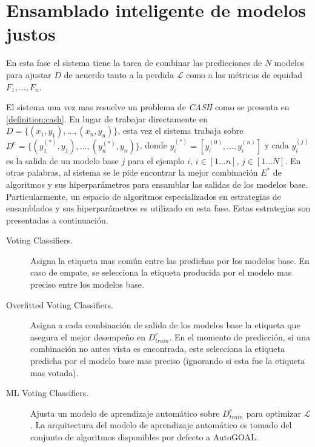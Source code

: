 
\section{Ensamblado inteligente de modelos justos}\label{section:second-phase}

En esta fase el sistema tiene la tarea de combinar las predicciones de $N$ modelos para ajustar $D$ de acuerdo tanto a la perdida $\mathcal{L}$ como a las métricas de equidad $F_1, \dots, F_n$.

El sistema una vez mas resuelve un problema de \emph{CASH} como se presenta en \ref{definition:cash}.
En lugar de trabajar directamente en $D = \{(x_1,y_1),\dots, (x_n,y_n)\}$, esta vez el sistema trabaja sobre $D^e = \{(y_1^{(*)}, y_1),\dots,(y_n^{(*)}, y_n)\}$, donde $y_i^{(*)} = [y_i^{(0)},\dots,y_i^{(n)}]$ y cada $y_i^{(j)}$ es la salida de un modelo base $j$ para el ejemplo $i$, $i\in[1 \dots n]$, $j\in[1 \dots N]$.
En otras palabras, al sistema se le pide encontrar la mejor combinación $E^*$ de algoritmos y sus hiperparámetros para ensamblar las salidas de los modelos base.
Particularmente, un espacio de algoritmos especializados en estrategias de ensamblados y sus hiperparámetros es utilizado en esta fase.
Estas estrategias son presentadas a continuación.

\begin{description}

    \item[Voting Classifiers.]
    Asigna la etiqueta mas común entre las predichas por los modelos base.
    En caso de empate, se selecciona la etiqueta producida por el modelo mas preciso entre los modelos base.
    
    \item[Overfitted Voting Classifiers.]
    Asigna a cada combinación de salida de los modelos base la etiqueta que asegura el mejor desempeño en $D_{train}^e$.
    En el momento de predicción, si una combinación no antes vista es encontrada, este selecciona la etiqueta predicha por el modelo base mas preciso (ignorando si esta fue la etiqueta mas votada).
    
    \item[ML Voting Classifiers.]
    Ajusta un modelo de aprendizaje automático sobre $D_{train}^e$ para optimizar $\mathcal{L}$.
    La arquitectura del modelo de aprendizaje automático es tomado del conjunto de algoritmos disponibles por defecto a AutoGOAL.
    
\end{description}

